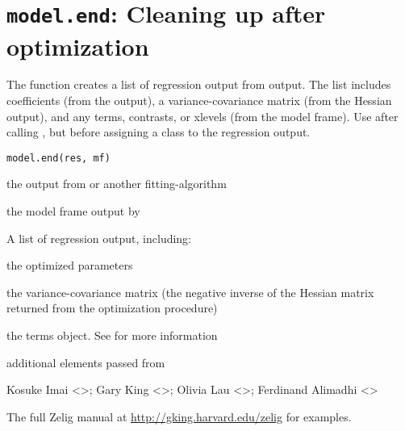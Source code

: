  \section{{\tt model.end}: Cleaning up after optimization}\label{ss:model.end}
\begin{Description}\relax
The  function creates a list of regression output from  
output.  The list includes coefficients (from the   output), a 
variance-covariance matrix (from the  Hessian output), and any terms, contrasts, or 
xlevels (from the model frame).  Use  after calling , but before 
assigning a 
class to the regression output.
\end{Description}
\begin{Usage}
\begin{verbatim}
model.end(res, mf)
\end{verbatim}
\end{Usage}
\begin{Arguments}
\begin{ldescription}
\item[\code{res}] the output from  or another fitting-algorithm
\item[\code{mf}] the model frame output by 
\end{ldescription}
\end{Arguments}
\begin{Value}
A list of regression output, including: 
\begin{ldescription}
\item[\code{coefficients}] the optimized parameters
\item[\code{variance}] the variance-covariance matrix (the negative
inverse of the Hessian matrix returned from the optimization
procedure)
\item[\code{terms}] the terms object.  See 
for more information
\item[\code{...}] additional elements passed from 
\end{ldescription}
\end{Value}
\begin{Author}\relax
Kosuke Imai <>; Gary King
<>; Olivia Lau <>; Ferdinand Alimadhi
<>
\end{Author}
\begin{SeeAlso}\relax
The full Zelig manual at \url{http://gking.harvard.edu/zelig} for examples.
\end{SeeAlso}


